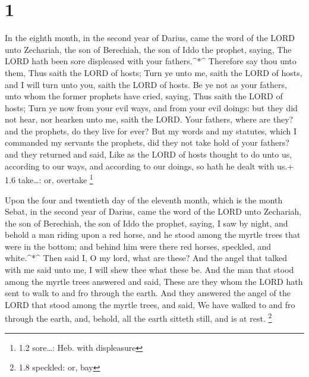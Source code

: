 \hypertarget{section}{%
\section{1}\label{section}}

 In the eighth month, in the second year of Darius, came the
word of the LORD unto Zechariah, the son of Berechiah, the son of Iddo
the prophet, saying,  The LORD hath been sore displeased
with your fathers.\^{}*\^{}  Therefore say thou unto them,
Thus saith the LORD of hosts; Turn ye unto me, saith the LORD of hosts,
and I will turn unto you, saith the LORD of hosts.  Be ye
not as your fathers, unto whom the former prophets have cried, saying,
Thus saith the LORD of hosts; Turn ye now from your evil ways, and from
your evil doings: but they did not hear, nor hearken unto me, saith the
LORD.  Your fathers, where are they? and the prophets, do
they live for ever?  But my words and my statutes, which I
commanded my servants the prophets, did they not take hold of your
fathers? and they returned and said, Like as the LORD of hosts thought
to do unto us, according to our ways, and according to our doings, so
hath he dealt with us.+ 1.6 take\ldots: or, overtake \footnote{1.2
  sore\ldots: Heb. with displeasure}

 Upon the four and twentieth day of the eleventh month,
which is the month Sebat, in the second year of Darius, came the word of
the LORD unto Zechariah, the son of Berechiah, the son of Iddo the
prophet, saying,  I saw by night, and behold a man riding
upon a red horse, and he stood among the myrtle trees that were in the
bottom; and behind him were there red horses, speckled, and
white.\^{}*\^{}  Then said I, O my lord, what are these? And
the angel that talked with me said unto me, I will shew thee what these
be.  And the man that stood among the myrtle trees answered
and said, These are they whom the LORD hath sent to walk to and fro
through the earth.  And they answered the angel of the LORD
that stood among the myrtle trees, and said, We have walked to and fro
through the earth, and, behold, all the earth sitteth still, and is at
rest. \footnote{1.8 speckled: or, bay}

